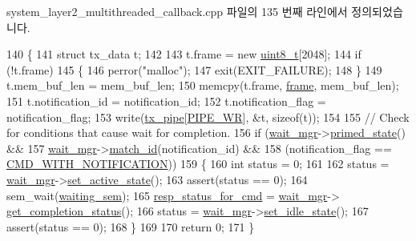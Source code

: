 system\+\_\+layer2\+\_\+multithreaded\+\_\+callback.\+cpp 파일의 135 번째 라인에서 정의되었습니다.


\begin{DoxyCode}
140 \{
141     \textcolor{keyword}{struct }tx\_data t;
142 
143     t.frame = \textcolor{keyword}{new} \hyperlink{stdint_8h_aba7bc1797add20fe3efdf37ced1182c5}{uint8\_t}[2048];
144     \textcolor{keywordflow}{if} (!t.frame)
145     \{
146         perror(\textcolor{stringliteral}{"malloc"});
147         exit(EXIT\_FAILURE);
148     \}
149     t.mem\_buf\_len = mem\_buf\_len;
150     memcpy(t.frame, \hyperlink{gst__avb__playbin_8c_ac8e710e0b5e994c0545d75d69868c6f0}{frame}, mem\_buf\_len);
151     t.notification\_id = notification\_id;
152     t.notification\_flag = notification\_flag;
153     write(\hyperlink{classavdecc__lib_1_1system__layer2__multithreaded__callback_a3709435136aa29f099b91ff297640b5b}{tx\_pipe}[\hyperlink{classavdecc__lib_1_1system__layer2__multithreaded__callback_a617559bbc3d02eeb189fad2c9979ef53a16de4a6975f52ef86dc6c3785d9dcb3f}{PIPE\_WR}], &t, \textcolor{keyword}{sizeof}(t));
154 
155     \textcolor{comment}{// Check for conditions that cause wait for completion.}
156     \textcolor{keywordflow}{if} (\hyperlink{classavdecc__lib_1_1system__layer2__multithreaded__callback_af8628baeb5f5db798721c4af01e8b253}{wait\_mgr}->\hyperlink{classavdecc__lib_1_1cmd__wait__mgr_a6c44383e58fc510f2117c67b931b22c8}{primed\_state}() &&
157         \hyperlink{classavdecc__lib_1_1system__layer2__multithreaded__callback_af8628baeb5f5db798721c4af01e8b253}{wait\_mgr}->\hyperlink{classavdecc__lib_1_1cmd__wait__mgr_a4ab93b35c0976b309ed639f832c6643f}{match\_id}(notification\_id) &&
158         (notification\_flag == \hyperlink{namespaceavdecc__lib_aabcadff06aa62be0ce47bc0646823604aba48b8a017e06fb240b650cdea965178}{CMD\_WITH\_NOTIFICATION}))
159     \{
160         \textcolor{keywordtype}{int} status = 0;
161 
162         status = \hyperlink{classavdecc__lib_1_1system__layer2__multithreaded__callback_af8628baeb5f5db798721c4af01e8b253}{wait\_mgr}->\hyperlink{classavdecc__lib_1_1cmd__wait__mgr_a87f1f4093f251dcd0a7b3636bb18b7f1}{set\_active\_state}();
163         assert(status == 0);
164         sem\_wait(\hyperlink{classavdecc__lib_1_1system__layer2__multithreaded__callback_a48196bb38ecccc4d99ae5c5d65e8b430}{waiting\_sem});
165         \hyperlink{classavdecc__lib_1_1system__layer2__multithreaded__callback_a6690b9a0a82de7292aef0572fcd2f842}{resp\_status\_for\_cmd} = \hyperlink{classavdecc__lib_1_1system__layer2__multithreaded__callback_af8628baeb5f5db798721c4af01e8b253}{wait\_mgr}->
      \hyperlink{classavdecc__lib_1_1cmd__wait__mgr_aa515915c2f77848f505321b080def00c}{get\_completion\_status}();
166         status = \hyperlink{classavdecc__lib_1_1system__layer2__multithreaded__callback_af8628baeb5f5db798721c4af01e8b253}{wait\_mgr}->\hyperlink{classavdecc__lib_1_1cmd__wait__mgr_a0d5ac08693ab386df80fa285e356e4b4}{set\_idle\_state}();
167         assert(status == 0);
168     \}
169 
170     \textcolor{keywordflow}{return} 0;
171 \}
\end{DoxyCode}


